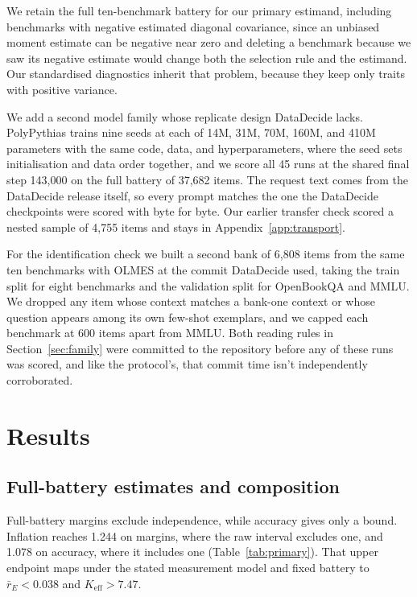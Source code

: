 \documentclass{article}
\begin{document}
We retain the full ten-benchmark battery for our primary estimand, including benchmarks with negative estimated diagonal covariance, since an unbiased moment estimate can be negative near zero and deleting a benchmark because we saw its negative estimate would change both the selection rule and the estimand. Our standardised diagnostics inherit that problem, because they keep only traits with positive variance.

We add a second model family whose replicate design DataDecide lacks. PolyPythias \citep{vanderwal2025} trains nine seeds at each of 14M, 31M, 70M, 160M, and 410M parameters with the same code, data, and hyperparameters, where the seed sets initialisation and data order together, and we score all 45 runs at the shared final step 143,000 on the full battery of 37,682 items. The request text comes from the DataDecide release itself, so every prompt matches the one the DataDecide checkpoints were scored with byte for byte. Our earlier transfer check scored a nested sample of 4,755 items and stays in Appendix~\ref{app:transport}.

For the identification check we built a second bank of 6,808 items from the same ten benchmarks with OLMES at the commit DataDecide used, taking the train split for eight benchmarks and the validation split for OpenBookQA and MMLU. We dropped any item whose context matches a bank-one context or whose question appears among its own few-shot exemplars, and we capped each benchmark at 600 items apart from MMLU. Both reading rules in Section~\ref{sec:family} were committed to the repository before any of these runs was scored, and like the protocol's, that commit time isn't independently corroborated.

\section{Results}
\subsection{Full-battery estimates and composition}
\label{sec:composition}
Full-battery margins exclude independence, while accuracy gives only a bound. Inflation reaches 1.244 on margins, where the raw interval excludes one, and 1.078 on accuracy, where it includes one (Table~\ref{tab:primary}). That upper endpoint maps under the stated measurement model and fixed battery to $\bar r_E<0.038$ and $K_{\mathrm{eff}}>7.47$.
\end{document}
